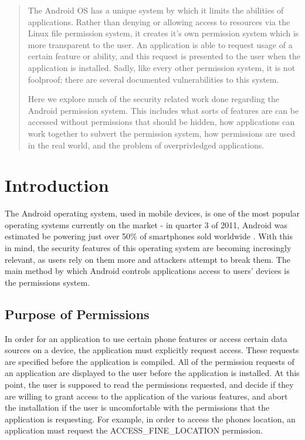 \documentclass[12pt,pdftex]{article}
\begin{document}


\tableofcontents

\begin{doublespace}

\begin{abstract}
The Android OS has a unique system by which it limits the abilities of applications.  Rather than denying or allowing access to resources via the Linux file permission system, it creates it's own permission system which is more transparent to the user.  An application is able to request usage of a certain feature or ability, and this request is presented to the user when the application is installed.  Sadly, like every other permission system, it is not foolproof; there are several documented vulnerabilities to this system.  

Here we explore much of the security related work done regarding the Android permission system.  This includes what sorts of features are can be accessed without permissions that should be hidden, how applications can work together to subvert the permission system, how permissions are used in the real world, and the problem of overprivledged applications.  

\end{abstract}

\section{Introduction}
The Android operating system, used in mobile devices, is one of the most popular operating systems currently on the market - in quarter 3 of 2011, Android was estimated be powering just over 50\% of smartphones sold worldwide \cite{gartner11}.  With this in mind, the security features of this operating system are becoming incresingly relevant, as users rely on them more and attackers attempt to break them.  The main method by which Android controls applications access to users' devices is the permissions system. 

\subsection{Purpose of Permissions}
In order for an application to use certain phone features or access certain data sources on a device, the application must explicitly request access.  These requests are specified before the application is compiled.  All of the permission requests of an application are displayed to the user before the application is installed.  At this point, the user is supposed to read the permissions requested, and decide if they are willing to grant access to the application of the various features, and abort the installation if the user is uncomfortable with the permissions that the application is requesting.  For example, in order to access the phones location, an application must request the ACCESS\_FINE\_LOCATION permission. \cite{androidSecAndPer}\cite{androidOpenSourceSec}


\end{doublespace}
\end{document}
